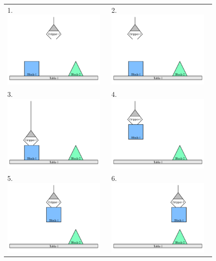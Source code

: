 \begin{figure}
\begin{center}
\begin{tabular}{p{4cm}p{4cm}}
1. \includegraphics[width=5cm]{gfx/blocks_world_example-1}  & 2. \includegraphics[width=5cm]{gfx/blocks_world_example-2} \\
3. \includegraphics[width=5cm]{gfx/blocks_world_example-3}  & 4. \includegraphics[width=5cm]{gfx/blocks_world_example-4} \\
5. \includegraphics[width=5cm]{gfx/blocks_world_example-5}  & 6. \includegraphics[width=5cm]{gfx/blocks_world_example-6} \\

\end{tabular}
\end{center}
\end{figure}

